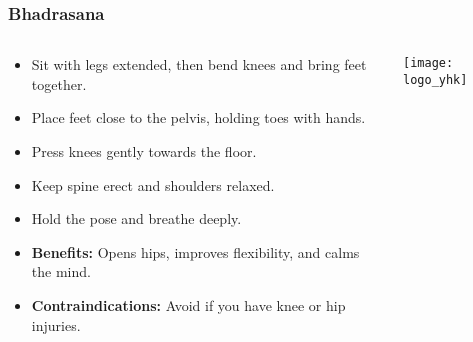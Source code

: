 \begin{frame}[fragile]\frametitle{Bhadrasana}
\begin{columns}
    \begin{column}[T]{0.5\linewidth}
      \begin{itemize}
        \item Sit with legs extended, then bend knees and bring feet together.
        \item Place feet close to the pelvis, holding toes with hands.
        \item Press knees gently towards the floor.
        \item Keep spine erect and shoulders relaxed.
        \item Hold the pose and breathe deeply.
        \item \textbf{Benefits:} Opens hips, improves flexibility, and calms the mind.
        \item \textbf{Contraindications:} Avoid if you have knee or hip injuries.
      \end{itemize}
    \end{column}
    \begin{column}[T]{0.5\linewidth}
        \begin{center}
        \texttt{[image: logo\_yhk]}
        \end{center}    
    \end{column}
  \end{columns}
\end{frame}


